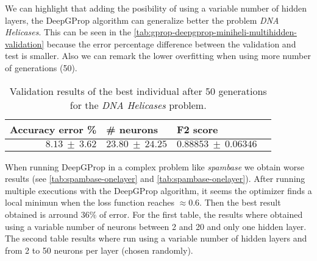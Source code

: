 \documentclass[runningheads]{llncs}
\begin{document}
We can highlight that adding the posibility of using a variable number of
hidden layers, the DeepGProp algorithm can generalize better the problem
\emph{DNA Helicases}. This can be seen in the
\autoref{tab:gprop-deepgprop-miniheli-multihidden-validation} because the error
percentage difference between the validation and test is smaller. Also we can
remark the lower overfitting when using more number of generations (50).

\begin{table}
    \centering
    \caption{
        Validation results of the best individual after 50 generations for the
        \emph{DNA Helicases} problem.
    }
    \label{tab:gprop-deepgprop-miniheli-multihidden-validation}
    \begin{tabular}{rlll}
        \textbf{Accuracy error \%} & \textbf{\# neurons} & \textbf{F2 score} \\
        \hline
        $8.13\ \pm\ 3.62$ & $23.80\ \pm\ 24.25$ & $0.88853\ \pm\ 0.06346$ \\
    \end{tabular}
\end{table}


When running DeepGProp in a complex problem like \emph{spambase} we obtain
worse results (see \autoref{tab:spambase-onelayer} and
\autoref{tab:spambase-onelayer}). After running multiple executions with the
DeepGProp algorithm, it seems the optimizer finds a local minimun when the
loss function reaches $\approx0.6$. Then the best result obtained is arround
$36\%$ of error. For the first table, the results where obtained using a
variable number of neurons between 2 and 20 and only one hidden layer. The
second table results where run using a variable number of hidden layers and
from 2 to 50 neurons per layer (chosen randomly).
\end{document}
